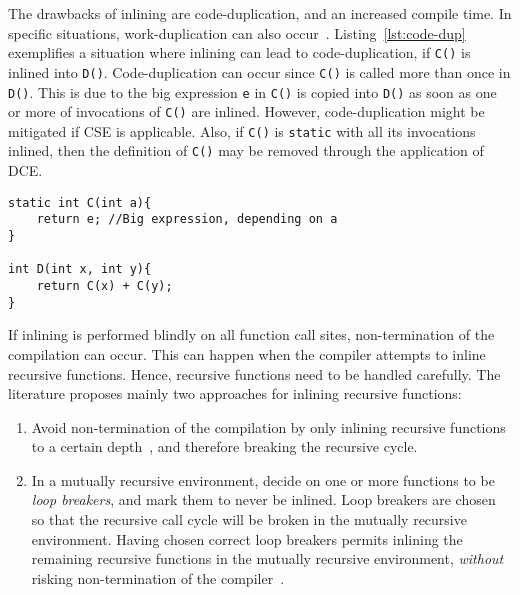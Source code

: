 The drawbacks of inlining are code-duplication, and an increased compile time.
In specific situations, work-duplication can also occur~\cite{GHCPaper}.
Listing~\ref{lst:code-dup} exemplifies a situation where inlining can lead to
code-duplication, if \lstinline!C()! is inlined into \lstinline!D()!.
Code-duplication can occur since \lstinline!C()! is called more than once in
\lstinline!D()!. This is due to the big expression \lstinline!e! in
\lstinline!C()! is copied into \lstinline!D()! as soon as one or more of
invocations of \lstinline!C()! are inlined. However, code-duplication might be
mitigated if CSE is applicable. Also, if \lstinline!C()! is \lstinline!static!
with all its invocations inlined, then the definition of \lstinline!C()! may be
removed through the application of DCE.

\begin{centering}
	\noindent\begin{minipage}{\textwidth}
		\begin{CenteredBox}
		\begin{lstlisting}[style=global_customcpp]
static int C(int a){
	return e; //Big expression, depending on a
}

int D(int x, int y){
	return C(x) + C(y);
}
		\end{lstlisting}
		\end{CenteredBox}
	\end{minipage}
	\label{lst:code-dup}
\end{centering}

If inlining is performed blindly on all function call sites, non-termination of
the compilation can occur. This can happen when the compiler attempts to inline
recursive functions. Hence, recursive functions need to be handled carefully.
The literature proposes mainly two approaches for inlining recursive functions:

\begin{enumerate}

	\item Avoid non-termination of the compilation by only inlining recursive
functions to a certain depth~\cite{GHCPaper}\cite{InlineWhenHowSerrano}, and
therefore breaking the recursive cycle.

	\item In a mutually recursive environment, decide on one or more functions
to be \textit{loop breakers}, and mark them to never be inlined. Loop breakers
are chosen so that the recursive call cycle will be broken in the mutually
recursive environment. Having chosen correct loop breakers permits inlining the
remaining recursive functions in the mutually recursive environment,
\textit{without} risking non-termination of the
compiler~\cite{BasMscThesis}\cite{GHCPaper}.

\end{enumerate}

